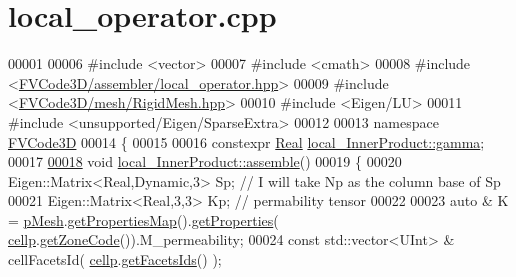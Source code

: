 \hypertarget{local__operator_8cpp_source}{}\section{local\+\_\+operator.\+cpp}
\label{local__operator_8cpp_source}

\begin{DoxyCode}
00001 
00006 \textcolor{preprocessor}{#include <vector>}
00007 \textcolor{preprocessor}{#include <cmath>}
00008 \textcolor{preprocessor}{#include <\hyperlink{local__operator_8hpp}{FVCode3D/assembler/local\_operator.hpp}>}
00009 \textcolor{preprocessor}{#include <\hyperlink{RigidMesh_8hpp}{FVCode3D/mesh/RigidMesh.hpp}>}
00010 \textcolor{preprocessor}{#include <Eigen/LU>}
00011 \textcolor{preprocessor}{#include <unsupported/Eigen/SparseExtra>}
00012 
00013 \textcolor{keyword}{namespace }\hyperlink{namespaceFVCode3D}{FVCode3D}
00014 \{
00015         
00016 constexpr \hyperlink{namespaceFVCode3D_a40c1f5588a248569d80aa5f867080e83}{Real} \hyperlink{classFVCode3D_1_1local__InnerProduct_af7c3e141a73231635abf5fdb7fe65fae}{local\_InnerProduct::gamma};
00017 
\hypertarget{local__operator_8cpp_source.tex_l00018}{}\hyperlink{classFVCode3D_1_1local__InnerProduct_a5e5ade44aeb3e5982cdbc20e7721e07a}{00018} \textcolor{keywordtype}{void} \hyperlink{classFVCode3D_1_1local__InnerProduct_a5e5ade44aeb3e5982cdbc20e7721e07a}{local\_InnerProduct::assemble}()      
00019 \{       
00020         Eigen::Matrix<Real,Dynamic,3> Sp;                                   \textcolor{comment}{// I will take Np as the column
       base of Sp}
00021         Eigen::Matrix<Real,3,3> Kp;                                         \textcolor{comment}{// permability tensor}
00022         
00023         \textcolor{keyword}{auto} & K = \hyperlink{classFVCode3D_1_1local__MimeticOperator_aaedb6f563c6c3c28afadc1d3725b3f71}{pMesh}.\hyperlink{classFVCode3D_1_1Rigid__Mesh_ab6e52fa6193e5db83fe7ccbb1c3737e8}{getPropertiesMap}().\hyperlink{classFVCode3D_1_1PropertiesMap_ace888d15c9a4ab13d5e217a3a565604c}{getProperties}(
      \hyperlink{classFVCode3D_1_1local__MimeticOperator_a771437af467a250d8bcaf1d06372ae8e}{cellp}.\hyperlink{classFVCode3D_1_1Rigid__Mesh_1_1Cell_a0a3b017d1297cca8e4a5d5708b82ce40}{getZoneCode}()).M\_permeability;
00024         \textcolor{keyword}{const} std::vector<UInt> & cellFacetsId( \hyperlink{classFVCode3D_1_1local__MimeticOperator_a771437af467a250d8bcaf1d06372ae8e}{cellp}.\hyperlink{classFVCode3D_1_1Rigid__Mesh_1_1Cell_adbfb39c41f1d6c6d96c77578eecbf766}{getFacetsIds}() );

\end{DoxyCode}
